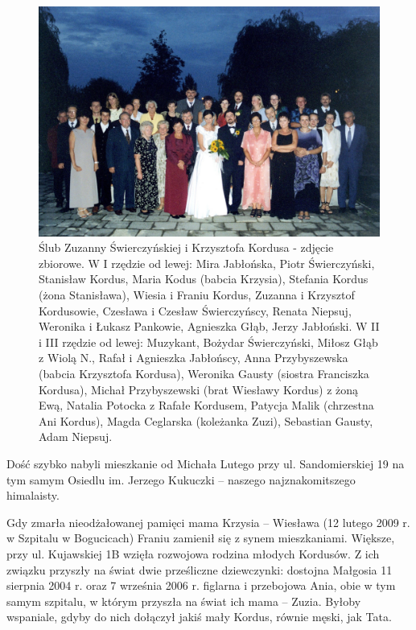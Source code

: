 \begin{figure}
\begin{center}
\includegraphics[width=200mm]{photo/zuzia_krzysiek_kordus_slub_2.jpg}
\caption{Ślub Zuzanny Świerczyńskiej i Krzysztofa Kordusa - zdjęcie zbiorowe. W I rzędzie od lewej: Mira Jabłońska, Piotr Świerczyński, Stanisław Kordus, Maria Kodus (babcia Krzysia), Stefania Kordus (żona Stanisława), Wiesia i Franiu Kordus, Zuzanna i Krzysztof Kordusowie, Czesława i Czesław Świerczyńscy, Renata Niepsuj, Weronika i Łukasz Pankowie, Agnieszka Głąb, Jerzy Jabłoński. W II i III rzędzie od lewej: Muzykant, Bożydar Świerczyński, Miłosz Głąb z Wiolą N., Rafał i Agnieszka Jabłońscy, Anna Przybyszewska (babcia Krzysztofa Kordusa), Weronika Gausty (siostra Franciszka Kordusa), Michał Przybyszewski (brat Wiesławy Kordus) z żoną Ewą, Natalia Potocka z Rafałe Kordusem, Patycja Malik (chrzestna Ani Kordus), Magda Ceglarska (koleżanka Zuzi), Sebastian Gausty, Adam Niepsuj.}
\end{center}
\end{figure}

Dość szybko nabyli mieszkanie od Michała Lutego przy ul. Sandomierskiej 19 na tym samym Osiedlu im. Jerzego Kukuczki – naszego najznakomitszego himalaisty.

Gdy zmarła nieodżałowanej pamięci mama Krzysia – Wiesława (12 lutego 2009 r. w Szpitalu w Bogucicach) Franiu zamienił się z synem mieszkaniami. Większe, przy ul. Kujawskiej 1B wzięła rozwojowa rodzina młodych Kordusów. Z ich związku przyszły na świat dwie prześliczne dziewczynki: dostojna Małgosia 11 sierpnia 2004 r. oraz 7 września 2006 r. figlarna i przebojowa Ania, obie w tym samym szpitalu, w którym przyszła na świat ich mama – Zuzia. Byłoby wspaniale, gdyby do nich dołączył jakiś mały Kordus, równie męski, jak Tata.

